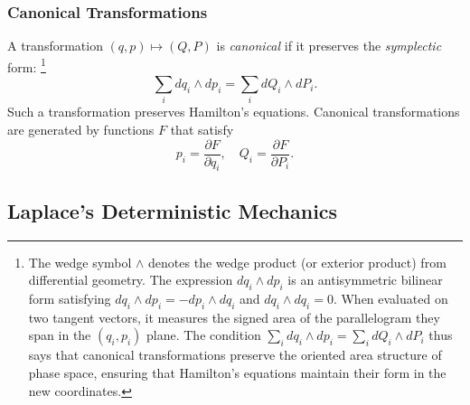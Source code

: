 \documentclass[12pt]{article}
\begin{document}
\subsubsection*{Canonical Transformations}

A transformation $(q, p) \mapsto (Q, P)$ is \emph{canonical} if it preserves the \emph{symplectic} form:%
\footnote{The wedge symbol $\wedge$ denotes the wedge product (or exterior product) from differential geometry. The expression $dq_i \wedge dp_i$ is an antisymmetric bilinear form satisfying $dq_i \wedge dp_i = -dp_i \wedge dq_i$ and $dq_i \wedge dq_i = 0$. When evaluated on two tangent vectors, it measures the signed area of the parallelogram they span in the $(q_i, p_i)$ plane. The condition $\sum_i dq_i \wedge dp_i = \sum_i dQ_i \wedge dP_i$ thus says that canonical transformations preserve the oriented area structure of phase space, ensuring that Hamilton's equations maintain their form in the new coordinates.}
%
\[
\sum_i dq_i \wedge dp_i = \sum_i dQ_i \wedge dP_i.
\]
Such a transformation preserves Hamilton's equations. Canonical transformations are generated by functions $F$ that satisfy
\[
p_i = \frac{\partial F}{\partial q_i}, \quad Q_i = \frac{\partial F}{\partial P_i}.
\]
%
%


\subsection*{Laplace's Deterministic Mechanics}
\end{document}
